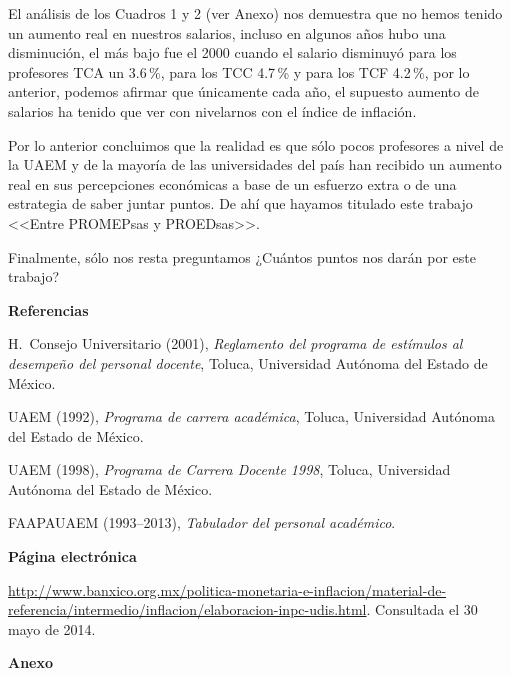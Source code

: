 El análisis de los  Cuadros 1 y 2 (ver Anexo) nos demuestra que no hemos tenido
un aumento real en nuestros salarios,  incluso en algunos años hubo una
disminución, el más bajo fue el  2000 cuando el salario disminuyó para los
profesores TCA un 3.6\,\%, para los TCC 4.7\,\% y para los TCF 4.2\,\%, por lo
anterior, podemos afirmar que únicamente cada año, el supuesto aumento de
salarios ha tenido que ver con nivelarnos con el índice de inflación.


Por lo anterior concluimos que la realidad es que sólo pocos profesores a
nivel de la UAEM y de la mayoría de las universidades del país han recibido
un aumento real en sus percepciones económicas a base de un esfuerzo extra
o de una estrategia de saber juntar puntos. De ahí que hayamos titulado
este trabajo <<Entre PROMEPsas y PROEDsas>>.


Finalmente,  sólo nos resta preguntamos ¿Cuántos puntos nos darán por este
trabajo?
\newpage

\textbf{Referencias}


H.\ Consejo Universitario (2001), \textit{Reglamento del programa de estímulos 
al desempeño del personal docente}, Toluca,
Universidad Autónoma del Estado de México.


UAEM (1992), \textit{Programa de carrera académica}, Toluca,
Universidad Autónoma del Estado de México.


UAEM (1998), \textit{Programa de Carrera Docente 1998}, Toluca,
Universidad Autónoma del Estado de México.


FAAPAUAEM (1993--2013), \textit{Tabulador del personal académico}.


\bigskip
{\bfseries Página electrónica}

\begin{sloppypar}
\url{http://www.banxico.org.mx/politica-monetaria-e-inflacion/material-de-referencia/intermedio/inflacion/elaboracion-inpc-udis.html}.
Consultada el 30 mayo de 2014.
\end{sloppypar}
\newpage

{\centering \textbf{Anexo}}

